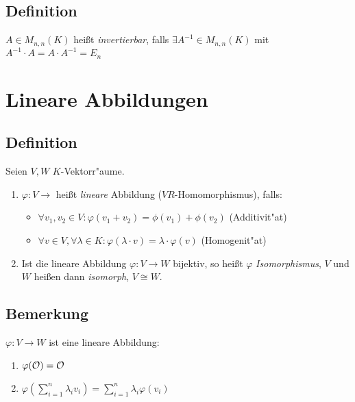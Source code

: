 	 \subsection{Definition}
	 
	 $A \in M_{n,n}(K)$ heißt \emph{invertierbar}, falls $\exists  A^{-1} \in M_{n,n}(K)$ mit $A^{-1} \cdot A = A \cdot A^{-1} = E_n$
	 
\section{Lineare Abbildungen}
\subsection{Definition}

Seien $V,W$ $K$-Vektorr"aume.
\begin{enumerate}
	\item
	$\varphi: V \rightarrow$ heißt \emph{lineare} Abbildung ($VR$-Homomorphismus), falls:
	\begin{itemize}
		\item
		$\forall v_1, v_2 \in V: \varphi(v_1+v_2) = \phi(v_1) + \phi(v_2)$ (Additivit"at)
		\item
		$\forall v \in V, \forall \lambda \in K: \varphi(\lambda \cdot v) = \lambda \cdot \varphi(v)$ (Homogenit"at)
	\end{itemize}
	\item
	Ist die lineare Abbildung $\varphi: V \rightarrow W$ bijektiv, so heißt $\varphi$ \emph{Isomorphismus}, $V$ und $W$ heißen dann \emph{isomorph}, $V \cong W$.
\end{enumerate}
\subsection{Bemerkung}
$\varphi: V \rightarrow W$ ist eine lineare Abbildung:
\begin{enumerate}
	\item
	$\varphi( \mathcal{O}) = \mathcal{O}$
	\item
	$\varphi \left(\sum_{i=1}^{n} \lambda_i v_i \right) = \sum_{i=1}^{n} \lambda_i \varphi(v_i)$ 
\end{enumerate}
